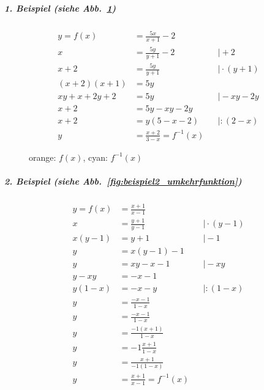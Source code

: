 \subparagraph{1. Beispiel (siehe Abb.~\ref{fig:beispiel1_umkehrfunktion})}

\begin{align*}
    y = f(x) &= \frac{5x}{x+1} -2 \\
    x &= \frac{5y}{y+1} -2 &&\mid +2 \\
    x+2 &= \frac{5y}{y+1} &&\mid  \cdot (y + 1) \\
    (x+2)(x+1) &= 5y \\
    xy + x + 2y + 2 &= 5y &&\mid -xy-2y \\
    x + 2 &= 5y -xy -2y \\
    x + 2 &= y (5-x -2 ) &&\mid : (2-x) \\
    y &= \frac{x+2}{3-x} = f^{-1}(x)
\end{align*}

\begin{figure}[H]
    \centering
    \caption{orange: \(f(x)\), cyan: \(f^{-1}(x)\)}\label{fig:beispiel1_umkehrfunktion}
\end{figure}

\subparagraph{2. Beispiel (siehe Abb.~\ref{fig:beispiel2_umkehrfunktion})}

\begin{align*}
    y = f(x) &= \frac{x+1}{x-1} \\
    x &= \frac{y+1}{y-1} &&\mid \cdot (y-1) \\
    x(y-1) &= y+1 &&\mid -1 \\
    y &= x(y-1)-1 \\
    y &= xy - x - 1 &&\mid -xy \\
    y - xy &= -x - 1 \\
    y(1-x) &= -x -y &&\mid : (1-x) \\
    y &= \frac{-x-1}{1-x} \\
    y &= \frac{-x-1}{1-x} \\
    y &= \frac{-1(x+1)}{1-x} \\
    y &= -1 \frac{x+1}{1-x} \\
    y &= \frac{x+1}{-1(1-x)} \\
    y &= \frac{x+1}{x-1} = f^{-1}(x)
\end{align*}

